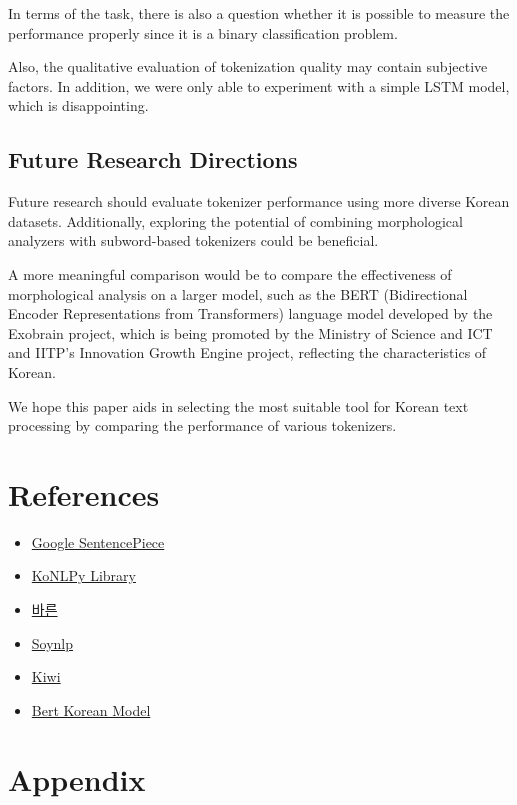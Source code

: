 \documentclass{article}
\begin{document}
In terms of the task, there is also a question whether it is possible to measure the performance properly since it is a binary classification problem.

Also, the qualitative evaluation of tokenization quality may contain subjective factors. In addition, we were only able to experiment with a simple LSTM model, which is disappointing.

\subsection{Future Research Directions}

Future research should evaluate tokenizer performance using more diverse Korean datasets. Additionally, exploring the potential of combining morphological analyzers with subword-based tokenizers could be beneficial.

A more meaningful comparison would be to compare the effectiveness of morphological analysis on a larger model, such as the BERT (Bidirectional Encoder Representations from Transformers) language model developed by the Exobrain project, which is being promoted by the Ministry of Science and ICT and IITP's Innovation Growth Engine project, reflecting the characteristics of Korean.

We hope this paper aids in selecting the most suitable tool for Korean text processing by comparing the performance of various tokenizers.



\section{References}

\begin{itemize}
    \item \href{https://github.com/google/sentencepiece}{Google SentencePiece}
    \item \href{https://konlpy.org/}{KoNLPy Library}
    \item \href{https://bareun.ai/}{바른}
    \item \href{https://github.com/lovit/soynlp}{Soynlp}
    \item \href{https://github.com/bab2min/Kiwi}{Kiwi}
    \item \href{https://aiopen.etri.re.kr/bertModel}{Bert Korean Model}
\end{itemize}

\section{Appendix}
\end{document}
